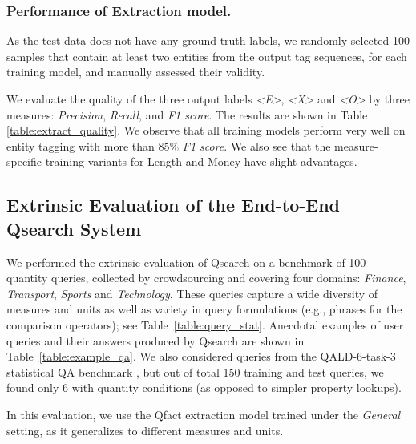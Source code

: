 \subsubsection{Performance of Extraction model.}
As the test data does not have any ground-truth labels, 
we randomly selected 100 samples that contain at least two entities from the output tag sequences, for each training model, and manually assessed their validity.

We evaluate the quality of the three output labels \textit{<E>}, \textit{<X>} and \textit{<O>} by three measures: \textit{Precision}, \textit{Recall}, and \textit{F1 score}.
The results are shown in Table \ref{table:extract_quality}. 
We observe that all training models perform very well on entity tagging with more than 85\% \textit{F1 score}. 
We also see that the measure-specific training variants for Length and Money
have slight advantages.



\subsection{Extrinsic Evaluation of the End-to-End Qsearch System}
We performed the extrinsic evaluation of Qsearch 
on a benchmark of 100  quantity queries, collected by crowdsourcing
and covering four domains: \textit{Finance}, \textit{Transport}, \textit{Sports} and \textit{Technology}. 
These queries capture a wide diversity of measures and units as well as variety in query formulations
(e.g., phrases for the comparison operators); see Table~\ref{table:query_stat}. 
Anecdotal examples of user queries and their answers produced by Qsearch are shown in Table~\ref{table:example_qa}.
We also considered queries from the QALD-6-task-3 statistical QA benchmark \cite{DBLP:conf/esws/UngerNC16},
but out of total 150 training and test queries, we found only 6 with quantity conditions (as opposed to simpler property lookups).

In this evaluation, we use the Qfact extraction model trained under the \textit{General} setting, as it generalizes to different measures and units.
 


